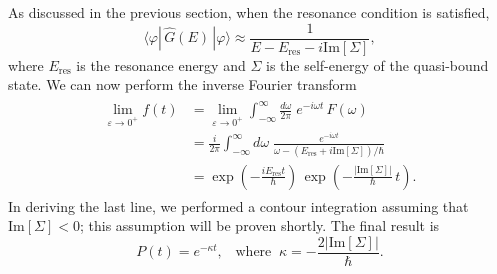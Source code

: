\documentclass[pra,12pt]{revtex4}
\begin{document}
As discussed in the previous section, when the resonance condition is
satisfied,
\begin{equation}
  \langle\varphi|\,\hat{G}(E)\,|\varphi\rangle \approx \frac{1}{\displaystyle E - E_{\mathrm{res}} - i \mathrm{Im}[\Sigma]},
\end{equation}
where $E_{\mathrm{res}}$ is the resonance energy and $\Sigma$ is the
self-energy of the quasi-bound state.  We can now perform the
inverse Fourier transform
\begin{align}
  \begin{aligned} \lim_{\varepsilon\rightarrow 0^+} f(t) &= \lim_{\varepsilon\rightarrow 0^+} \int_{-\infty}^{\infty} \frac{d\omega}{2\pi} \; e^{-i\omega t} \, F(\omega) \\ &= \frac{i}{2\pi} \int_{-\infty}^{\infty} d\omega\; \frac{e^{-i\omega t}}{\omega - (E_{\mathrm{res}}+i \mathrm{Im}[\Sigma])/\hbar}\\ &= \exp\left(-\frac{iE_{\mathrm{res}}t}{\hbar}\right)\, \exp\left(-\frac{|\mathrm{Im}[\Sigma]|}{\hbar}\,t\right). \end{aligned}
\end{align}
In deriving the last line, we performed a contour integration assuming
that $\mathrm{Im}[\Sigma] < 0$; this assumption will be proven
shortly.  The final result is
\begin{equation}
  P(t) = e^{-\kappa t}, \;\;\;\mathrm{where}\;\;\kappa = -\frac{2|\mathrm{Im}[\Sigma]|}{\hbar}.
\end{equation}
\end{document}
